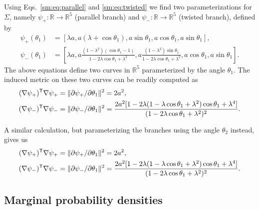 Using Eqs.~\eqref{sm:eq:parallel} and \eqref{sm:eq:twisted} we find two parameterizations for $\Sigma$, namely $\psi_+: \mathbb{R} \to \mathbb{R}^5$ (parallel branch) and $\psi_-: \mathbb{R} \to \mathbb{R}^5$ (twisted branch), defined by
%
\begin{subequations}
  \begin{align}
    \psi_+(\theta_1) &= \left[\lambda a, a(\lambda + \cos{\theta_1}), a\sin{\theta_1}, a\cos{\theta_1}, a\sin{\theta_1}\right],\label{sm:eq:4bar_param_parallel}\\
    \psi_-(\theta_1) &= \left[\lambda a, a\frac{(1-\lambda^2)(\cos{\theta_1} - 1)}{1-2\lambda\cos{\theta_1}+\lambda^2}, a\frac{(1-\lambda^2)\sin{\theta_1}}{1-2\lambda\cos{\theta_1}+\lambda^2}, a\cos{\theta_1}, a\sin{\theta_1}\right].\label{sm:eq:4bar_param_twisted}
  \end{align}
\end{subequations}
%
The above equations define two curves in $\mathbb{R}^{5}$ parameterized by the angle $\theta_{1}$.
The induced metric on these two curves can be readily computed as
%
\begin{subequations}
  \begin{align}
    (\nabla\psi_{+})^\mathsf{T}\nabla\psi_+ &= \lVert\partial{\psi_{+}}/\partial{\theta_{1}}\rVert^{2} = 2 a^2,\label{sm:eq:4bar_ind1}\\
    (\nabla\psi_{-})^\mathsf{T}\nabla\psi_- &= \lVert\partial{\psi_{-}}/\partial{\theta_{1}}\rVert^{2} = \frac{2a^2[1-2\lambda(1-\lambda\cos{\theta_1}+\lambda^2)\cos{\theta_1} + \lambda^4]}{(1-2\lambda\cos{\theta_1}+ \lambda^2)^2}.\label{sm:eq:4bar_ind2}
  \end{align}
\end{subequations}

A similar calculation, but parameterizing the branches using the angle $\theta_{2}$ instead, gives us
%
\begin{subequations}
  \begin{align}
    (\nabla\psi_{+})^\mathsf{T}\nabla\psi_+ &= \lVert\partial{\psi_{+}}/\partial{\theta_{1}}\rVert^{2} = 2 a^2,\label{sm:eq:4bar_ind1}\\
    (\nabla\psi_{-})^\mathsf{T}\nabla\psi_- &= \lVert\partial{\psi_{-}}/\partial{\theta_{1}}\rVert^{2} = \frac{2a^2[1-2\lambda(1-\lambda\cos{\theta_1}+\lambda^2)\cos{\theta_1} + \lambda^4]}{(1-2\lambda\cos{\theta_1}+ \lambda^2)^2}.\label{sm:eq:4bar_q2_ind2}
  \end{align}
\end{subequations}

\subsection{Marginal probability densities}

